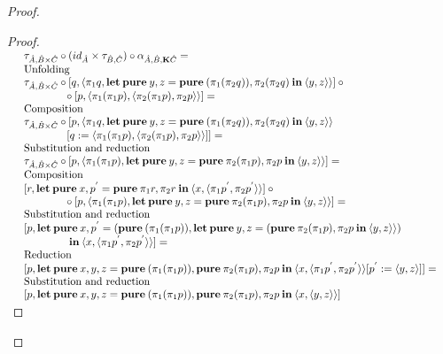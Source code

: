 \documentclass[a4paper]{article}
\begin{document}
\begin{proof}
\begin{proof}
$\begin{array}{lll}
&\tau_{\hat{A}, \hat{B} \times \hat{C}} \circ (id_{\hat{A}} \times \tau_{\hat{B}, \hat{C}}) \circ \alpha_{\hat{A}, \hat{B}, {\bf K}\hat{C}} = & \\
&\text{Unfolding}& \\
&\tau_{\hat{A}, \hat{B} \times \hat{C}} \circ [q, \langle \pi_1 q, {\bf let \: pure \:} y, z = {\bf pure \:} (\pi_1 (\pi_2 q)), \pi_2 (\pi_2 q) {\: \bf in \:} \langle y, z \rangle \rangle] \: \circ & \\
&\quad\quad\quad\quad \circ \: [p, \langle \pi_1 (\pi_1 p), \langle \pi_2 (\pi_1 p), \pi_2 p \rangle \rangle] = & \\
&\text{Composition}& \\
&\tau_{\hat{A}, \hat{B} \times \hat{C}} \circ [p, \langle \pi_1 q, {\bf let \: pure \:} y, z = {\bf pure \:} (\pi_1 (\pi_2 q)), \pi_2 (\pi_2 q) {\: \bf in \:} \langle y, z \rangle \rangle & \\
&\quad\quad\quad\quad [q := \langle \pi_1 (\pi_1 p), \langle \pi_2 (\pi_1 p), \pi_2 p \rangle \rangle]] = & \\
&\text{Substitution and reduction}& \\
&\tau_{\hat{A}, \hat{B} \times \hat{C}} \circ [p, \langle \pi_1 (\pi_1 p), {\bf let \: pure \:} y, z = {\bf pure \:} \pi_2 (\pi_1 p), \pi_2 p {\: \bf in \:} \langle y, z \rangle \rangle] = & \\
&\text{Composition}& \\
&[r, {\bf let \: pure \:} x, p^{'} = {\bf pure \:} \pi_1 r, \pi_2 r {\: \bf in \:} \langle x, \langle \pi_1 p^{'}, \pi_2 p^{'} \rangle\rangle] \: \circ & \\
&\quad\quad\quad\quad \circ \: [p, \langle \pi_1 (\pi_1 p), {\bf let \: pure \:} y, z = {\bf pure \:} \pi_2 (\pi_1 p), \pi_2 p {\: \bf in \:} \langle y, z \rangle \rangle] = & \\
&\text{Substitution and reduction}& \\
&[p, {\bf let \: pure \:} x, p^{'} = ({\bf pure \:} (\pi_1 (\pi_1 p)), {\bf let \: pure \:} y, z = ({\bf pure \:} \pi_2 (\pi_1 p), \pi_2 p {\: \bf in \:} \langle y, z \rangle \rangle) & \\
&\quad\quad\quad\quad {\: \bf in \:} \langle x, \langle \pi_1 p^{'}, \pi_2 p^{'} \rangle\rangle ] = & \\
&\text{Reduction}& \\
&[p, {\bf let \: pure \:} x,y,z = {\bf pure \:} (\pi_1 (\pi_1 p)), {\bf pure \:} \pi_2 (\pi_1 p), \pi_2 p {\: \bf in \:} \langle x, \langle \pi_1 p^{'}, \pi_2 p^{'} \rangle\rangle [p^{'} := \langle y, z \rangle]] = & \\
&\text{Substitution and reduction}& \\
&[p, {\bf let \: pure \:} x,y,z = {\bf pure \:} (\pi_1 (\pi_1 p)), {\bf pure \:} \pi_2 (\pi_1 p), \pi_2 p {\: \bf in \:} \langle x, \langle y, z \rangle\rangle]&
\end{array}$


\end{proof}
\end{proof}
\end{document}
